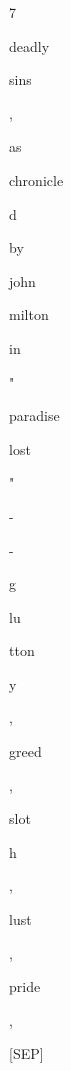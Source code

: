 \documentclass[varwidth=150mm]{standalone}
\begin{document}
\begin{CJK*}{UTF8}{gbsn}
{{{\colorbox{red!4.7155656814575195}{\strut 7} \colorbox{red!3.899749279022217}{\strut deadly} \colorbox{red!10.422113418579102}{\strut sins} \colorbox{red!3.636474609375}{\strut ,} \colorbox{red!8.929121017456055}{\strut as} \colorbox{red!0.0}{\strut chronicle}\colorbox{red!0.0}{\strut d} \colorbox{red!1.2022919654846191}{\strut by} \colorbox{red!5.493226528167725}{\strut john} \colorbox{red!9.739041328430176}{\strut milton} \colorbox{red!9.76725959777832}{\strut in} \colorbox{red!18.223960876464844}{\strut "} \colorbox{red!5.507035255432129}{\strut paradise} \colorbox{red!25.41229248046875}{\strut lost} \colorbox{red!48.42014694213867}{\strut "} \colorbox{red!7.28712797164917}{\strut -} \colorbox{red!16.471708297729492}{\strut -} \colorbox{red!0.0}{\strut g}\colorbox{red!0.0}{\strut lu}\colorbox{red!2.1857821941375732}{\strut tton}\colorbox{red!1.0875968933105469}{\strut y} \colorbox{red!1.4913132190704346}{\strut ,} \colorbox{red!1.0604872703552246}{\strut greed} \colorbox{red!2.513409376144409}{\strut ,} \colorbox{red!4.839609146118164}{\strut slot}\colorbox{red!0.0}{\strut h} \colorbox{red!2.7362029552459717}{\strut ,} \colorbox{red!21.376243591308594}{\strut lust} \colorbox{red!6.141304969787598}{\strut ,} \colorbox{red!4.356834411621094}{\strut pride} \colorbox{red!26.246191024780273}{\strut ,} \colorbox{red!7.825394630432129}{\strut [SEP]}
}}}
\end{CJK*}
\end{document}
